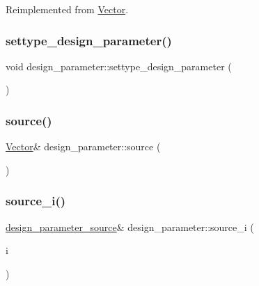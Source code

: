 Reimplemented from \mbox{\hyperlink{class_vector_a20550e70d02cbe484032c7f6b0833a0f}{Vector}}.

\mbox{\label{classdesign__parameter_a8b19d277f2b7d09c2531a527dfc0359e}} 
\subsubsection{\texorpdfstring{settype\+\_\+design\+\_\+parameter()}{settype\_design\_parameter()}}
{\footnotesize\ttfamily void design\+\_\+parameter\+::settype\+\_\+design\+\_\+parameter (\begin{DoxyParamCaption}{ }\end{DoxyParamCaption})}

\mbox{\label{classdesign__parameter_a7285d5775f7a1b5ee30d82fb3148c7f6}} 
\subsubsection{\texorpdfstring{source()}{source()}}
{\footnotesize\ttfamily \mbox{\hyperlink{class_vector}{Vector}}\& design\+\_\+parameter\+::source (\begin{DoxyParamCaption}{ }\end{DoxyParamCaption})\hspace{0.3cm}{\ttfamily [inline]}}

\mbox{\label{classdesign__parameter_a2e2a51d68253f1d5e6ce76840f527517}} 
\subsubsection{\texorpdfstring{source\+\_\+i()}{source\_i()}}
{\footnotesize\ttfamily \mbox{\hyperlink{classdesign__parameter__source}{design\+\_\+parameter\+\_\+source}}\& design\+\_\+parameter\+::source\+\_\+i (\begin{DoxyParamCaption}\item[{\mbox{\hyperlink{galois_8h_a09fddde158a3a20bd2dcadb609de11dc}{I\+NT}}}]{i }\end{DoxyParamCaption})\hspace{0.3cm}{\ttfamily [inline]}}

